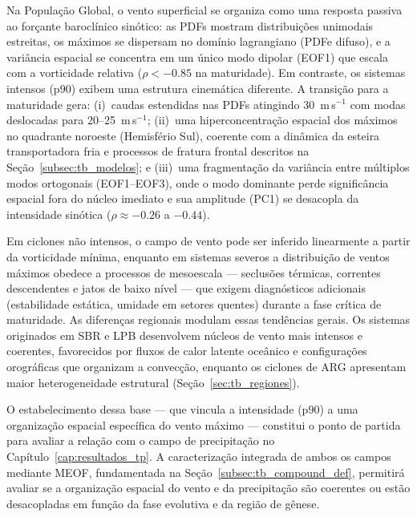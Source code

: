 Na População Global, o vento superficial se organiza como uma resposta passiva ao forçante baroclínico sinótico: as PDFs mostram distribuições unimodais estreitas, os máximos se dispersam no domínio lagrangiano (PDFe difuso), e a variância espacial se concentra em um único modo dipolar (EOF1) que escala com a vorticidade relativa ($\rho < -0.85$ na maturidade).
Em contraste, os sistemas intensos (p90) exibem uma estrutura cinemática diferente.
A transição para a maturidade gera:
(i)~caudas estendidas nas PDFs atingindo 30~m\,s$^{-1}$ com modas deslocadas para 20--25~m\,s$^{-1}$;
(ii)~uma hiperconcentração espacial dos máximos no quadrante noroeste (Hemisfério Sul), coerente com a dinâmica da esteira transportadora fria e processos de fratura frontal descritos na Seção~\ref{subsec:tb_modelos}; e
(iii)~uma fragmentação da variância entre múltiplos modos ortogonais (EOF1--EOF3), onde o modo dominante perde significância espacial fora do núcleo imediato e sua amplitude (PC1) se desacopla da intensidade sinótica ($\rho \approx -0.26$ a $-0.44$).

Em ciclones não intensos, o campo de vento pode ser inferido linearmente a partir da vorticidade mínima, enquanto em sistemas severos a distribuição de ventos máximos obedece a processos de mesoescala --- seclusões térmicas, correntes descendentes e jatos de baixo nível --- que exigem diagnósticos adicionais (estabilidade estática, umidade em setores quentes) durante a fase crítica de maturidade.
As diferenças regionais modulam essas tendências gerais.
Os sistemas originados em SBR e LPB desenvolvem núcleos de vento mais intensos e coerentes, favorecidos por fluxos de calor latente oceânico e configurações orográficas que organizam a convecção, enquanto os ciclones de ARG apresentam maior heterogeneidade estrutural (Seção~\ref{sec:tb_regiones}).

O estabelecimento dessa base --- que vincula a intensidade (p90) a uma organização espacial específica do vento máximo --- constitui o ponto de partida para avaliar a relação com o campo de precipitação no Capítulo~\ref{cap:resultados_tp}.
A caracterização integrada de ambos os campos mediante MEOF, fundamentada na Seção~\ref{subsec:tb_compound_def}, permitirá avaliar se a organização espacial do vento e da precipitação são coerentes ou estão desacopladas em função da fase evolutiva e da região de gênese.